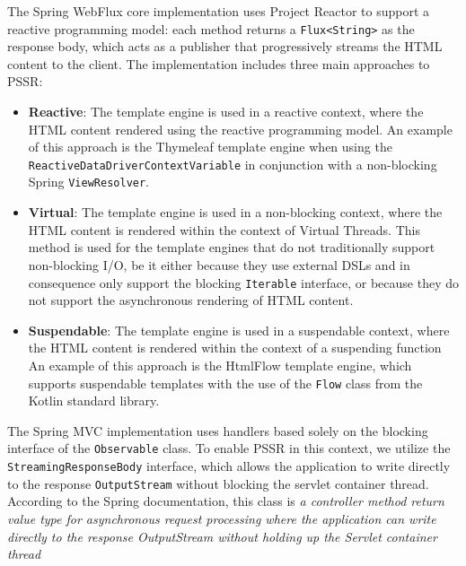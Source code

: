 The Spring WebFlux core implementation uses Project Reactor to support a
reactive programming model: each method returns a \texttt{Flux<String>} as the
response body, which acts as a publisher that progressively streams the HTML
content to the client. The implementation includes three main approaches to
PSSR:
\begin{itemize}
  \item \textbf{Reactive}: The template engine is used in a reactive context,
        where the HTML content rendered using the reactive programming model.
        An example of this approach is the Thymeleaf template engine
        when using the \texttt{ReactiveDataDriverContextVariable} in conjunction with a
        non-blocking Spring \texttt{ViewResolver}.
  \item \textbf{Virtual}: The template engine is used in a non-blocking
        context, where the HTML content is rendered within the context of Virtual
        Threads. This method is used for the template engines that do not traditionally
        support non-blocking I/O, be it either because they use external DSLs and in
        consequence only support the blocking \texttt{Iterable} interface, or
        because they do not support the asynchronous rendering of HTML content.
  \item \textbf{Suspendable}: The template engine is used in a suspendable
        context, where the HTML content is rendered within the context of a suspending function
        An example of this approach is the HtmlFlow template engine, which
        supports suspendable templates with the use of the \texttt{Flow} class from the
        Kotlin standard library.
\end{itemize}
The Spring MVC implementation uses handlers based solely on the blocking
interface of the \texttt{Observable} class. To enable PSSR in this context, we
utilize the \texttt{StreamingResponseBody} interface, which allows the
application to write directly to the response \texttt{OutputStream} without
blocking the servlet container thread. According to the Spring documentation,
this class is \textit{a controller method return value type for asynchronous
  request processing where the application can write directly to the response
  OutputStream without holding up the Servlet container thread}

